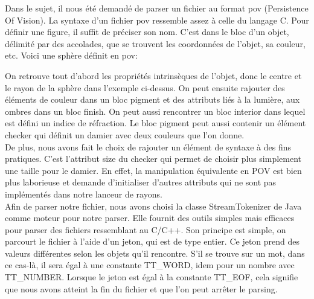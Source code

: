 \documentclass[../../Rapport RayTracer]{subfiles}
\begin{document}
Dans le sujet, il nous été demandé de parser un fichier au format pov (Persistence Of Vision). La syntaxe d'un fichier pov ressemble assez à celle du langage C. Pour définir une figure, il suffit de préciser son nom. C'est dans le bloc d'un objet, délimité par des accolades, que se trouvent les coordonnées de l'objet, sa couleur, etc. Voici une sphère définit en pov:

 

On retrouve tout d'abord les propriétés intrinsèques de l'objet, donc le centre et le rayon de la sphère dans l'exemple ci-dessus. On peut ensuite rajouter des éléments de couleur dans un bloc pigment et des attributs liés à la lumière, aux ombres dans un bloc finish. On peut aussi rencontrer un bloc interior dans lequel est défini un indice de réfraction.
Le bloc pigment peut aussi contenir un élément checker qui définit un damier avec deux couleurs que l'on donne.
\\
De plus, nous avons fait le choix de rajouter un élément de syntaxe à des fins pratiques. C'est l'attribut size du checker qui permet de choisir plus simplement une taille pour le damier. En effet, la manipulation équivalente en POV est bien plus laborieuse et demande d'initialiser d'autres attributs qui ne sont pas implémentés dans notre lanceur de rayons.
\\
 Afin de parser notre fichier, nous avons choisi la classe StreamTokenizer de Java comme moteur pour notre parser. Elle fournit des outils simples mais efficaces pour parser des fichiers ressemblant au C/C++. Son principe est simple, on parcourt le fichier à l'aide d'un jeton, qui est de type entier. Ce jeton prend des valeurs différentes selon les objets qu'il rencontre. S'il se trouve sur un mot, dans ce cas-là, il sera égal à une constante TT\_WORD, idem pour un nombre avec TT\_NUMBER. Lorsque le jeton est égal à la constante TT\_EOF, cela signifie que nous avons atteint la fin du fichier et que l'on peut arrêter le parsing.
\end{document}
